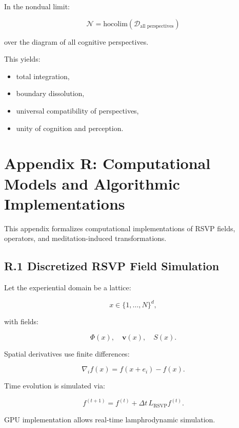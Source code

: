 \documentclass[12pt]{article}
\begin{document}
In the nondual limit:

\[
\mathcal{N}
=
\mathrm{hocolim}(\mathcal{D}_{\text{all perspectives}})
\]

over the diagram of all cognitive perspectives.

This yields:

\begin{itemize}
    \item total integration,
    \item boundary dissolution,
    \item universal compatibility of perspectives,
    \item unity of cognition and perception.
\end{itemize}



\section*{Appendix R: Computational Models and Algorithmic Implementations}

This appendix formalizes computational implementations of RSVP fields, operators,
and meditation-induced transformations.

\subsection*{R.1 Discretized RSVP Field Simulation}

Let the experiential domain be a lattice:

\[
x \in \{1, \ldots, N\}^d,
\]

with fields:

\[
\Phi(x), \quad \mathbf{v}(x), \quad S(x).
\]

Spatial derivatives use finite differences:

\[
\nabla_i f(x) = f(x+e_i) - f(x).
\]

Time evolution is simulated via:

\[
f^{(t+1)} = f^{(t)} + \Delta t\, L_{\text{RSVP}} f^{(t)}.
\]

GPU implementation allows real-time lamphrodynamic simulation.

\end{document}
